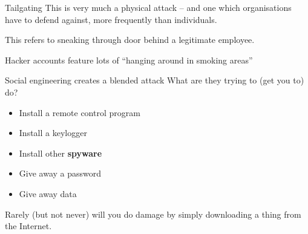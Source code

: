 \documentclass[xcolor=table]{beamer}
\begin{document}
\begin{frame}{Tailgating}
	This is very much a physical attack -- and one which organisations have to defend against, more frequently than individuals.

	\vspace{0.5em}

 	This refers to sneaking through door behind a legitimate employee.  

	\vspace{0.5em}

	Hacker accounts feature lots of ``hanging around in smoking areas''

\end{frame}



\begin{frame}{Social engineering creates a blended attack}
	What are they trying to (get you to) do? 

	\begin{itemize}
		\item Install a remote control program
		\item Install a keylogger
		\item Install other \textbf{spyware}
		\item Give away a password
		\item Give away data
	\end{itemize}
	Rarely (but not never) will you do damage by simply downloading a thing from the Internet. 
\end{frame}
\end{document}
